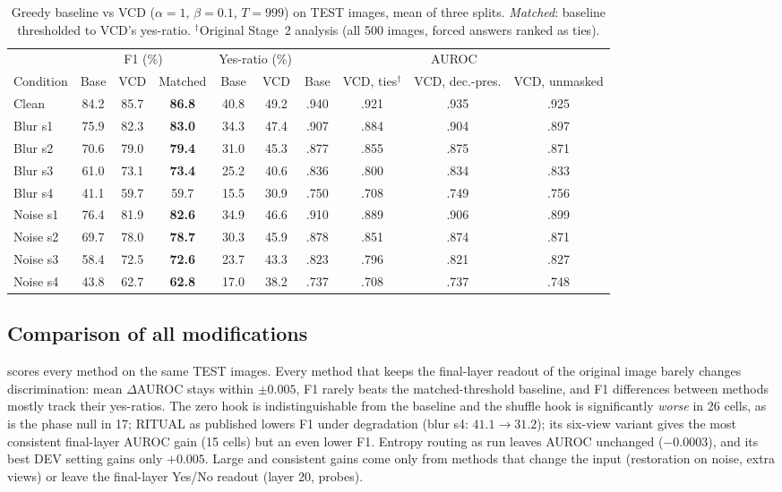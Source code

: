 \documentclass[10pt,a4paper]{article}
\begin{document}
\begin{table}[t]
\centering\small
\setlength{\tabcolsep}{5pt}
\caption{Greedy baseline vs VCD ($\alpha{=}1$, $\beta{=}0.1$, $T{=}999$) on TEST images, mean of three splits. \emph{Matched}: baseline thresholded to VCD's yes-ratio. $^\dagger$Original Stage~2 analysis (all 500 images, forced answers ranked as ties).}
\label{tab:stage2}
\begin{tabular}{@{}l ccc cc cccc@{}}
\toprule
 & \multicolumn{3}{c}{F1 (\%)} & \multicolumn{2}{c}{Yes-ratio (\%)} & \multicolumn{4}{c}{AUROC}\\
\cmidrule(lr){2-4}\cmidrule(lr){5-6}\cmidrule(l){7-10}
Condition & Base & VCD & Matched & Base & VCD & Base & VCD, ties$^\dagger$ & VCD, dec.-pres. & VCD, unmasked\\
\midrule
Clean    & 84.2 & 85.7 & \textbf{86.8} & 40.8 & 49.2 & .940 & .921 & .935 & .925\\
\addlinespace
Blur s1  & 75.9 & 82.3 & \textbf{83.0} & 34.3 & 47.4 & .907 & .884 & .904 & .897\\
Blur s2  & 70.6 & 79.0 & \textbf{79.4} & 31.0 & 45.3 & .877 & .855 & .875 & .871\\
Blur s3  & 61.0 & 73.1 & \textbf{73.4} & 25.2 & 40.6 & .836 & .800 & .834 & .833\\
Blur s4  & 41.1 & 59.7 & 59.7 & 15.5 & 30.9 & .750 & .708 & .749 & .756\\
\addlinespace
Noise s1 & 76.4 & 81.9 & \textbf{82.6} & 34.9 & 46.6 & .910 & .889 & .906 & .899\\
Noise s2 & 69.7 & 78.0 & \textbf{78.7} & 30.3 & 45.9 & .878 & .851 & .874 & .871\\
Noise s3 & 58.4 & 72.5 & \textbf{72.6} & 23.7 & 43.3 & .823 & .796 & .821 & .827\\
Noise s4 & 43.8 & 62.7 & \textbf{62.8} & 17.0 & 38.2 & .737 & .708 & .737 & .748\\
\bottomrule
\end{tabular}
\end{table}

\subsection{Comparison of all modifications}\label{sec:all}
 scores every method on the same TEST images. Every method that keeps the final-layer readout of the original image barely changes discrimination: mean $\Delta$AUROC stays within $\pm0.005$, F1 rarely beats the matched-threshold baseline, and F1 differences between methods mostly track their yes-ratios. The zero hook is indistinguishable from the baseline and the shuffle hook is significantly \emph{worse} in 26 cells, as is the phase null in 17; RITUAL as published lowers F1 under degradation (blur s4: $41.1\to31.2$); its six-view variant gives the most consistent final-layer AUROC gain (15 cells) but an even lower F1. Entropy routing as run leaves AUROC unchanged ($-0.0003$), and its best DEV setting gains only $+0.005$. Large and consistent gains come only from methods that change the input (restoration on noise, extra views) or leave the final-layer Yes/No readout (layer 20, probes).
\end{document}

